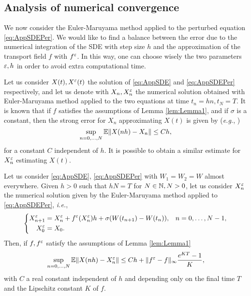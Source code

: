 \subsection{Analysis of numerical convergence}

We now consider the Euler-Maruyama method applied to the perturbed equation \eqref{eq:AppSDEPer}. We would like to find a balance between the error due to the numerical integration of the SDE with step size $h$ and the approximation of the transport field $f$ with $f^\varepsilon$. In this way, one can choose wisely the two parameters $\varepsilon, h$ in order to avoid extra computational time.

\noindent Let us consider $X(t), X^\varepsilon(t)$ the solution of \eqref{eq:AppSDE} and \eqref{eq:AppSDEPer} respectively, and let us denote with $X_n, X_n^\varepsilon$ the numerical solution obtained with Euler-Maruyama method applied to the two equations at time $t_n = hn, t_N = T$. It is known that if $f$ satisfies the assumptions of Lemma \ref{lem:Lemma1}, and if $\sigma$ is a constant, then the strong error for $X_n$ approximating $X(t)$ is given by (\textit{e.g.}, \cite[Chapter 10]{Kloeden1992})
\begin{equation}\label{eq:StrongEM}
	\sup_{n = 0, \dots, N} \mathbb{E} \|X(nh) - X_n\| \leq C h,
\end{equation}
for a constant $C$ independent of $h$. It is possible to obtain a similar estimate for $X_n^\varepsilon$ estimating $X(t)$. 
\begin{theorem}\label{thm:StrongConv} Let us consider \eqref{eq:AppSDE}, \eqref{eq:AppSDEPer} with $W_1 = W_2 = W$ almost everywhere. Given $h > 0$ such that $hN = T$ for $N \in \mathbb{N}, N > 0$, let us consider $X_n^\varepsilon$ the numerical solution given by the Euler-Maruyama method applied to \eqref{eq:AppSDEPer}, \textit{i.e.},
\begin{equation*}
\left \{
\begin{aligned}
	X^\varepsilon_{n+1} &= X^\varepsilon_n + f^\varepsilon(X^\varepsilon_n)h + \sigma (W(t_{n+1}) - W(t_n)), && n = 0, \dots, N - 1, \\
	X^\varepsilon_0 &= X_0.
\end{aligned} \right .
\end{equation*}
Then, if $f, f^\varepsilon$ satisfy the assumptions of Lemma \ref{lem:Lemma1}
\begin{equation}\label{eq:StrongConvEpl}
	\sup_{n = 0, \dots, N} \mathbb{E} \|X(nh) - X^\varepsilon_n\| \leq C h +  \|f^\varepsilon - f\|_{\infty} \frac{e^{KT} - 1}{K}, 
\end{equation}
with $C$ a real constant independent of $h$ and depending only on the final time $T$ and the Lipschitz constant $K$ of $f$.
\end{theorem}

